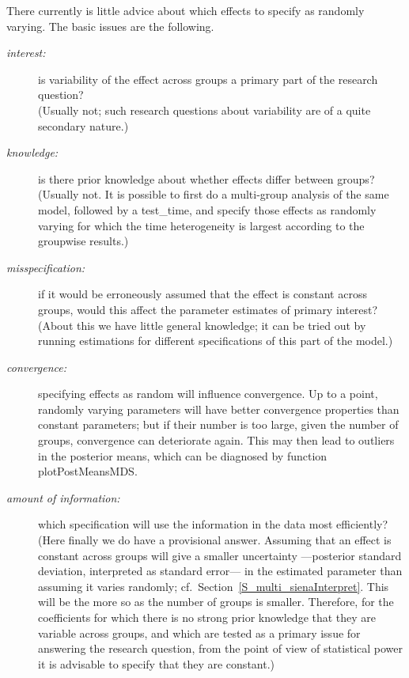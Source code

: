 \documentclass[a4paper,fleqn,11pt]{article}
\newcommand{\+}{\, + \,}
\newcommand{\sfn}[1]{\textsf{#1}}
\begin{document}
There currently is little advice about which effects to specify
as randomly varying.
The basic issues are the following.
\begin{description}
\item[\emph{interest:}] is variability of the effect across groups
   a primary part of the research question?\\
   (Usually not; such research questions about variability
   are of a quite secondary nature.)
\item[\emph{knowledge:}] is there prior knowledge about whether
   effects differ between groups?\\
   (Usually not. It is possible to first do a multi-group analysis of the same model,
   followed by a \textsf{test\_time}, and specify those effects as randomly
   varying for which the time heterogeneity is largest according to the
   groupwise results.)
\item[\emph{misspecification:}] if it would be erroneously assumed
    that the effect is constant across groups, would this affect
    the parameter estimates of primary interest?\\
    (About this we have little general knowledge; it can be tried out
    by running estimations for different specifications of this
    part of the model.)
\item[\emph{convergence:}] specifying effects as random will
    influence convergence. Up to a point, randomly varying parameters
    will have better convergence properties than constant parameters;
    but if their number is too large, given the number of groups,
    convergence can deteriorate again.
    This may then lead to outliers in the posterior means,
    which can be diagnosed by function \sfn{plotPostMeansMDS}.
\item[\emph{amount of information:}] which specification will
     use the information in the data most efficiently?\\
     (Here finally we do have a provisional answer. Assuming that an effect is constant
     across groups will give a smaller uncertainty ---posterior standard
     deviation, interpreted as standard error--- in the estimated parameter
     than assuming it varies randomly;
     cf.\ Section~\ref{S_multi_sienaInterpret}.
     This will be the more so as the number of
     groups is smaller. Therefore, for the coefficients for which
     there is no strong prior knowledge that they are variable across groups,
     and which are tested as a primary issue for answering the research question,
     from the point of view of statistical power
     it is advisable to specify that they are constant.)
\end{description}
\end{document}

